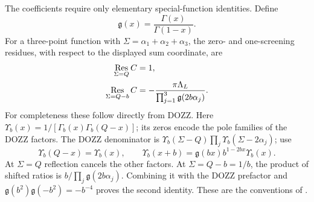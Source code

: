 The coefficients require only elementary special-function
identities. Define
\begin{equation}
 \mathfrak g(x)=\frac{\Gamma(x)}{\Gamma(1-x)}.
 \label{eq:gammaratio}
\end{equation}
For a three-point function with $\Sigma=\alpha_1+\alpha_2+\alpha_3$,
the zero- and one-screening residues, with respect to the
displayed sum coordinate, are
\begin{align}
 \operatorname*{Res}_{\Sigma=Q}C&=1,\notag\\
 \operatorname*{Res}_{\Sigma=Q-b}C
  &=-\frac{\pi\Lambda_L}
       {\prod_{j=1}^3\mathfrak g(2b\alpha_j)}.
 \label{eq:threepointscreeningresidues}
\end{align}
For completeness these follow directly from DOZZ. Here $\Upsilon_b(x)=1/[\Gamma_b(x)\Gamma_b(Q-x)]$;
its zeros encode the pole families of the DOZZ factors.
The DOZZ denominator is $\Upsilon_b(\Sigma-Q)\prod_j\Upsilon_b(\Sigma-2\alpha_j)$;
use
\[
 \Upsilon_b(Q-x)=\Upsilon_b(x),\qquad
 \Upsilon_b(x+b)=\mathfrak g(bx)b^{1-2bx}\Upsilon_b(x).
\]
At $\Sigma=Q$ reflection cancels the other factors. At
$\Sigma=Q-b=1/b$, the product of shifted ratios is
$b/\prod_j\mathfrak g(2b\alpha_j)$. Combining it with the
DOZZ prefactor and
$\mathfrak g(b^2)\mathfrak g(-b^2)=-b^{-4}$ proves the
second identity. These are the conventions of
\cite[eqs.~(9), (11), (13)]{TeschnerRevisited}.

